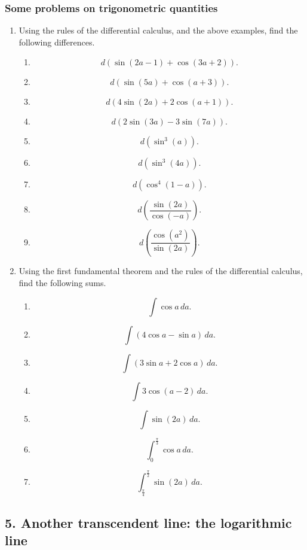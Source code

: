 \documentclass[twoside,openright]{article}
\begin{document}
\subsubsection*{Some problems on trigonometric quantities}

\label{pset6}
\begin{enumerate}
\item Using the rules of the differential calculus, and the above examples, find the following differences.
\begin{enumerate}
\item $$d(\sin(2a-1) + \cos(3a +2)).$$
\item $$d(\sin(5a) + \cos(a+3)).$$
\item $$d(4\sin(2a) + 2\cos(a+1)).$$
\item $$d(2\sin(3a) - 3\sin(7a)).$$
\item $$d(\sin^3(a)).$$
\item $$d(\sin^3(4a)).$$
\item $$d(\cos^4(1-a)).$$
\item $$d\left(\frac{\sin(2a)}{\cos(-a)}\right).$$
\item $$d\left(\frac{\cos(a^2)}{\sin(2a)}\right).$$
\end{enumerate}

\item Using the first fundamental theorem and the rules of the differential calculus, find the following sums.  
\begin{enumerate}
\item $$\int\! \cos a \,da.$$
\item $$\int\! (4\cos a - \sin a)\,da.$$
\item $$\int\! (3\sin a + 2\cos a)\,da.$$
\item $$\int\! 3\cos(a -2)\,da.$$
\item $$\int\! \sin (2a) \,da.$$
\item $$\int_0^\frac{\pi}{3}\!\cos a\,da.$$
\item $$\int_\frac{\pi}{4}^\frac{\pi}{2} \sin(2a)\,da.$$
\end{enumerate}

\end{enumerate}

\subsection*{5. Another transcendent line: the logarithmic line}
\end{document}
